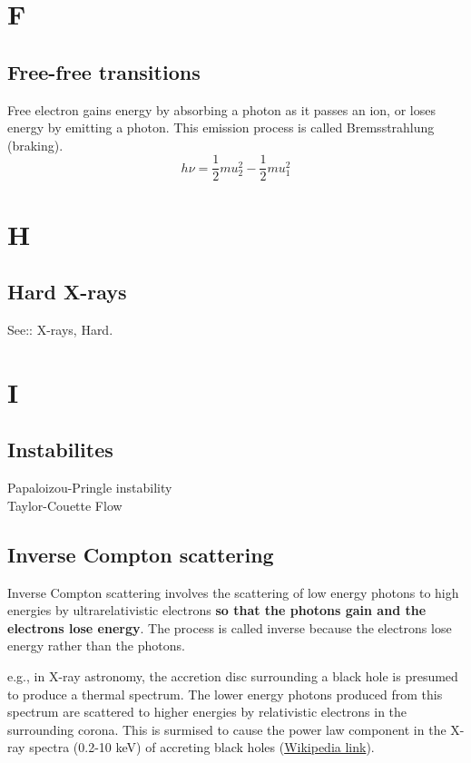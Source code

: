 \documentclass[11pt]{article}
\begin{document}
\section*{F}
    \subsection*{Free-free transitions}
Free electron gains energy by absorbing a photon as it passes an ion,
or loses energy by emitting a photon. This emission process is called
Bremsstrahlung (braking).
\begin{equation}
 h \nu = \frac{1}{2} m u^{2}_{2} - \frac{1}{2} m u^{2}_{1}
\end{equation}




\section*{H}
    \subsection*{Hard X-rays}
    See:: X-rays, Hard. 

\section*{I}
    \subsection*{Instabilites}
    Papaloizou-Pringle instability\\
    Taylor-Couette Flow\\

    \subsection*{Inverse Compton scattering}
    Inverse Compton scattering involves the scattering of low energy
    photons to high energies by ultrarelativistic electrons {\bf so that
      the photons gain and the electrons lose energy}. The process is called
    inverse because the electrons lose energy rather than the photons.

    e.g., in X-ray astronomy, the accretion disc surrounding a black
    hole is presumed to produce a thermal spectrum. The lower energy
    photons produced from this spectrum are scattered to higher energies
    by relativistic electrons in the surrounding corona. This is surmised
    to cause the power law component in the X-ray spectra (0.2-10 keV) of
    accreting black holes (\href{https://en.wikipedia.org/wiki/Compton\_scattering}{Wikipedia link}).
\end{document}
